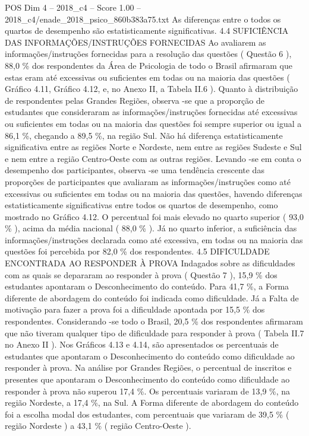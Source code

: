 \begin{textsample}{POS Dim 4 – 2018\_c4 – Score 1.00 – 2018\_c4/enade\_2018\_psico\_860b383a75.txt}
As diferenças entre o todos os quartos de desempenho são estatisticamente significativas. 4.4 SUFICIÊNCIA DAS INFORMAÇÕES/INSTRUÇÕES FORNECIDAS Ao avaliarem as informações/instruções fornecidas para a resolução das questões ( Questão 6 ), 88,0 \% dos respondentes da Área de Psicologia de todo o Brasil afirmaram que estas eram até excessivas ou suficientes em todas ou na maioria das questões ( Gráfico 4.11, Gráfico 4.12, e, no Anexo II, a Tabela II.6 ).
Quanto à distribuição de respondentes pelas Grandes Regiões, observa -se que a proporção de estudantes que consideraram as informações/instruções fornecidas até excessivas ou suficientes em todas ou na maioria das questões foi sempre superior ou igual a 86,1 \%, chegando a 89,5 \%, na região Sul.
Não há diferença estatisticamente significativa entre as regiões Norte e Nordeste, nem entre as regiões Sudeste e Sul e nem entre a região Centro-Oeste com as outras regiões.
Levando -se em conta o desempenho dos participantes, observa -se uma tendência crescente das proporções de participantes que avaliaram as informações/instruções como até excessivas ou suficientes em todas ou na maioria das questões, havendo diferenças estatisticamente significativas entre todos os quartos de desempenho, como mostrado no Gráfico 4.12.
O percentual foi mais elevado no quarto superior ( 93,0 \% ), acima da média nacional ( 88,0 \% ).
Já no quarto inferior, a suficiência das informações/instruções declarada como até excessiva, em todas ou na maioria das questões foi percebida por 82,0 \% dos respondentes. 4.5 DIFICULDADE ENCONTRADA AO RESPONDER À PROVA Indagados sobre as dificuldades com as quais se depararam ao responder à prova ( Questão 7 ), 15,9 \% dos estudantes apontaram o Desconhecimento do conteúdo.
Para 41,7 \%, a Forma diferente de abordagem do conteúdo foi indicada como dificuldade.
Já a Falta de motivação para fazer a prova foi a dificuldade apontada por 15,5 \% dos respondentes.
Considerando -se todo o Brasil, 20,5 \% dos respondentes afirmaram que não tiveram qualquer tipo de dificuldade para responder à prova ( Tabela II.7 no Anexo II ).
Nos Gráficos 4.13 e 4.14, são apresentados os percentuais de estudantes que apontaram o Desconhecimento do conteúdo como dificuldade ao responder à prova.
Na análise por Grandes Regiões, o percentual de inscritos e presentes que apontaram o Desconhecimento do conteúdo como dificuldade ao responder à prova não superou 17,4 \%.
Os percentuais variaram de 13,9 \%, na região Nordeste, a 17,4 \%, na Sul.
A Forma diferente de abordagem do conteúdo foi a escolha modal dos estudantes, com percentuais que variaram de 39,5 \% ( região Nordeste ) a 43,1 \% ( região Centro-Oeste ).

\end{textsample}
